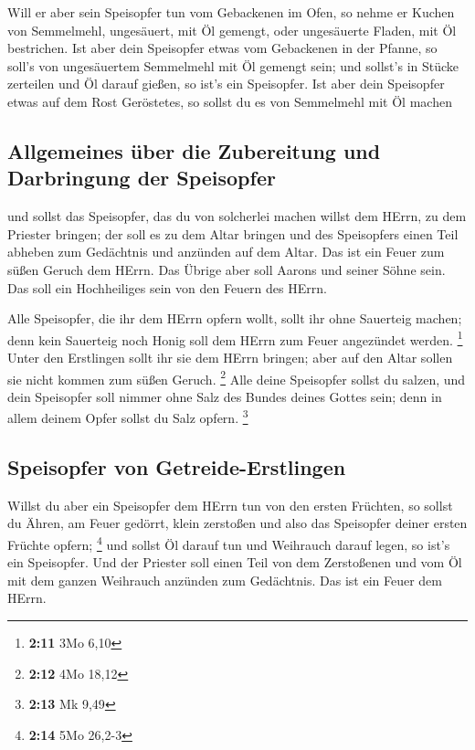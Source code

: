  Will er aber sein Speisopfer tun vom Gebackenen im Ofen,
so nehme er Kuchen von Semmelmehl, ungesäuert, mit Öl gemengt, oder
ungesäuerte Fladen, mit Öl bestrichen.  Ist aber dein
Speisopfer etwas vom Gebackenen in der Pfanne, so soll's von
ungesäuertem Semmelmehl mit Öl gemengt sein;  und sollst's
in Stücke zerteilen und Öl darauf gießen, so ist's ein Speisopfer.
 Ist aber dein Speisopfer etwas auf dem Rost Geröstetes,
so sollst du es von Semmelmehl mit Öl machen

\hypertarget{allgemeines-uxfcber-die-zubereitung-und-darbringung-der-speisopfer}{%
\subsection{Allgemeines über die Zubereitung und Darbringung der
Speisopfer}\label{allgemeines-uxfcber-die-zubereitung-und-darbringung-der-speisopfer}}

 und sollst das Speisopfer, das du von solcherlei machen
willst dem HErrn, zu dem Priester bringen; der soll es zu dem Altar
bringen  und des Speisopfers einen Teil abheben zum
Gedächtnis und anzünden auf dem Altar. Das ist ein Feuer zum süßen
Geruch dem HErrn.  Das Übrige aber soll Aarons und seiner
Söhne sein. Das soll ein Hochheiliges sein von den Feuern des HErrn.

 Alle Speisopfer, die ihr dem HErrn opfern wollt, sollt
ihr ohne Sauerteig machen; denn kein Sauerteig noch Honig soll dem HErrn
zum Feuer angezündet werden. \footnote{\textbf{2:11} 3Mo 6,10}
 Unter den Erstlingen sollt ihr sie dem HErrn bringen;
aber auf den Altar sollen sie nicht kommen zum süßen Geruch. \footnote{\textbf{2:12}
  4Mo 18,12}  Alle deine Speisopfer sollst du salzen, und
dein Speisopfer soll nimmer ohne Salz des Bundes deines Gottes sein;
denn in allem deinem Opfer sollst du Salz opfern. \footnote{\textbf{2:13}
  Mk 9,49}

\hypertarget{speisopfer-von-getreide-erstlingen}{%
\subsection{Speisopfer von
Getreide-Erstlingen}\label{speisopfer-von-getreide-erstlingen}}

 Willst du aber ein Speisopfer dem HErrn tun von den
ersten Früchten, so sollst du Ähren, am Feuer gedörrt, klein zerstoßen
und also das Speisopfer deiner ersten Früchte opfern; \footnote{\textbf{2:14}
  5Mo 26,2-3}  und sollst Öl darauf tun und Weihrauch
darauf legen, so ist's ein Speisopfer.  Und der Priester
soll einen Teil von dem Zerstoßenen und vom Öl mit dem ganzen Weihrauch
anzünden zum Gedächtnis. Das ist ein Feuer dem HErrn.

